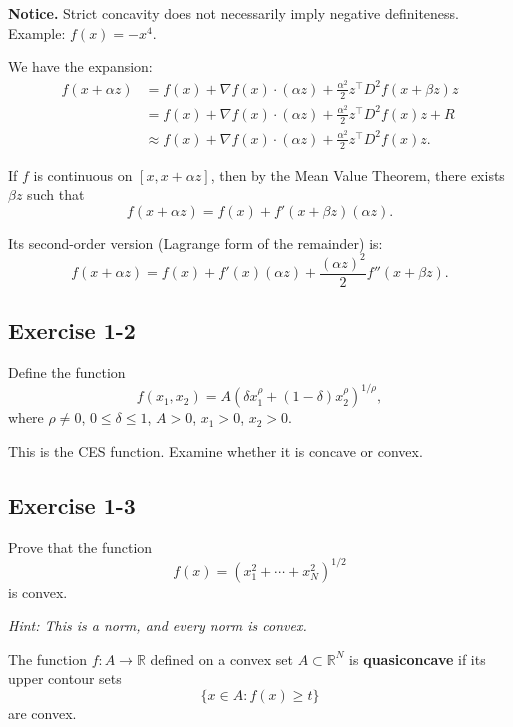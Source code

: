 \textbf{Notice.} Strict concavity does not necessarily imply negative definiteness.  
Example: $f(x) = -x^4$.

\vspace{1em}

We have the expansion:
\[
\begin{aligned}
f(x+\alpha z)
&= f(x) + \nabla f(x)\cdot (\alpha z)
+ \frac{\alpha^2}{2} z^\top D^2 f(x+\beta z) z\\
&= f(x) + \nabla f(x)\cdot (\alpha z)
+ \frac{\alpha^2}{2} z^\top D^2 f(x) z + R\\
&\approx f(x) + \nabla f(x)\cdot (\alpha z)
+ \frac{\alpha^2}{2} z^\top D^2 f(x) z.
\end{aligned}
\]

If $f$ is continuous on $[x, x+\alpha z]$, then by the Mean Value Theorem,
there exists $\beta z$ such that
\[
f(x+\alpha z) = f(x) + f'(x+\beta z)(\alpha z).
\]

Its second-order version (Lagrange form of the remainder) is:
\[
f(x+\alpha z)
= f(x) + f'(x)(\alpha z)
+ \frac{(\alpha z)^2}{2} f''(x+\beta z).
\]


\begin{tcolorbox}[breakable]
\subsection*{Exercise 1-2}

Define the function
\[
f(x_1,x_2) = A\left(\delta x_1^{\rho} + (1-\delta)x_2^{\rho}\right)^{1/\rho},
\]
where $\rho \neq 0$, $0 \le \delta \le 1$, $A>0$, $x_1>0$, $x_2>0$.

This is the CES function. Examine whether it is concave or convex.
\end{tcolorbox}

\begin{tcolorbox}[breakable]

\subsection*{Exercise 1-3}

Prove that the function
\[
f(x) = \left(x_1^2 + \cdots + x_N^2\right)^{1/2}
\]
is convex.

\textit{Hint: This is a norm, and every norm is convex.}

\end{tcolorbox}


\vspace{1em}

The function $f : A \to \mathbb{R}$ defined on a convex set $A \subset \mathbb{R}^N$
is \textbf{quasiconcave} if its upper contour sets
\[
\{x \in A : f(x) \ge t\}
\]
are convex.

